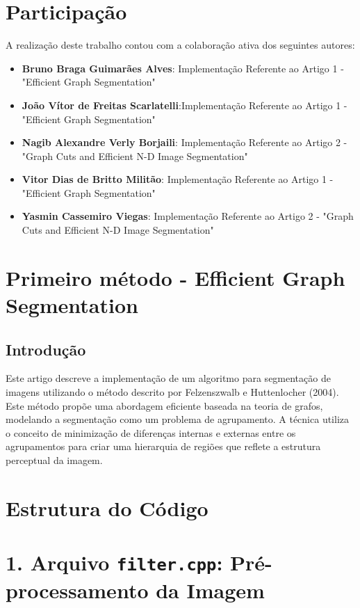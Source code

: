 \documentclass[12pt]{article}
\begin{document}
\section*{Participação}
A realização deste trabalho contou com a colaboração ativa dos seguintes autores: 
\begin{itemize}
    \item \textbf{Bruno Braga Guimarães Alves}: Implementação Referente ao Artigo 1 - "Efficient Graph Segmentation"
    \item \textbf{João Vítor de Freitas Scarlatelli}:Implementação Referente ao Artigo 1 - "Efficient Graph Segmentation"
    \item \textbf{Nagib Alexandre Verly Borjaili}: Implementação Referente ao Artigo 2 - "Graph Cuts and Efficient N-D Image Segmentation"
    \item \textbf{Vitor Dias de Britto Militão}: Implementação Referente ao Artigo 1 - "Efficient Graph Segmentation"
    \item \textbf{Yasmin Cassemiro Viegas}: Implementação Referente ao Artigo 2 - "Graph Cuts and Efficient N-D Image Segmentation"
\end{itemize}

\section*{Primeiro método - Efficient Graph Segmentation}

\subsection*{Introdução}
Este artigo descreve a implementação de um algoritmo para segmentação de imagens utilizando o método descrito por Felzenszwalb e Huttenlocher (2004). Este método propõe uma abordagem eficiente baseada na teoria de grafos, modelando a segmentação como um problema de agrupamento. A técnica utiliza o conceito de minimização de diferenças internas e externas entre os agrupamentos para criar uma hierarquia de regiões que reflete a estrutura perceptual da imagem.

\section*{Estrutura do Código}

\section*{1. Arquivo \texttt{filter.cpp}: Pré-processamento da Imagem}
\end{document}
